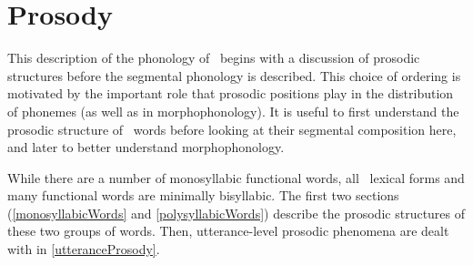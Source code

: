 


\chapter{Prosody}\label{ProsodicStructure}

This description of the phonology of \PS\ begins with a discussion of prosodic structures before the segmental phonology is described. This choice of ordering is motivated by the important role that prosodic positions play in the distribution of phonemes (as well as in morphophonology). It is useful to first understand the prosodic structure of \PS\ words before looking at their segmental composition here, and later to better understand morphophonology. 

While there are a number of monosyllabic functional words, all \PS\ lexical forms and many functional words are minimally bisyllabic. 
The first two sections (\SEC\ref{monosyllabicWords} and \SEC\ref{polysyllabicWords}) describe the prosodic structures of these two groups of words.  
Then, utterance-level prosodic phenomena are dealt with in \SEC\ref{utteranceProsody}.


